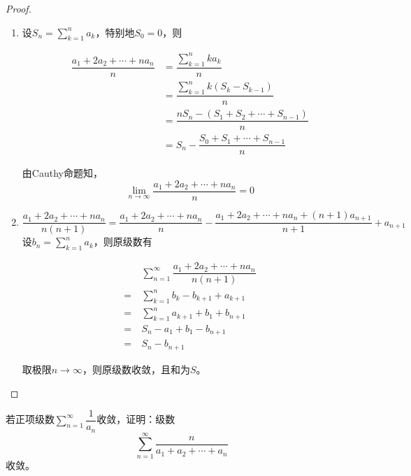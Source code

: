 \begin{proof}
    
    \begin{enumerate}
        
        \item 
            设$S_n = \sum\limits_{k=1}^{n}{a_k}$，特别地$S_0 = 0$，则

            \begin{align*}
                \dfrac{a_1 + 2a_2 + \cdots + na_n}{n} &= \dfrac{\sum\limits_{k=1}^{n}{ka_k}}{n} \\
                & = \dfrac{\sum\limits_{k=1}^{n}{k(S_k - S_{k-1})}}{n} \\
                & = \dfrac{nS_n - (S_1 + S_2 + \cdots + S_{n-1})}{n} \\
                & = S_n - \dfrac{S_0 + S_1 + \cdots + S_{n-1}}{n}
            \end{align*}

            由\textup{Cauthy}命题知，
            $$\lim\limits_{n\to\infty}{\dfrac{a_1 + 2a_2 + \cdots + na_n}{n}} = 0$$

        \item 
            $$\dfrac{a_1 + 2a_2 + \cdots + na_n}{n(n+1)} = \dfrac{a_1 + 2a_2 + \cdots + na_n}{n} - \dfrac{a_1 + 2a_2 + \cdots + na_n + (n+1)a_{n+1}}{n+1} + a_{n+1}$$
            设$b_n = \sum\limits_{k=1}^{n}{a_k}$，则原级数有

            \begin{align*}
                &\sum\limits_{n=1}^{\infty}{\dfrac{a_1 + 2a_2 + \cdots + na_n}{n(n+1)}} \\
                = \  & \sum\limits_{k=1}^{n}{b_k - b_{k+1} + a_{k+1}} \\
                = \  & \sum\limits_{k=1}^{n}{a_{k+1} + b_1 + b_{n+1}} \\
                = \  & S_n - a_1 + b_1 - b_{n+1} \\
                = \  & S_n - b_{n+1} 
            \end{align*}

            取极限$n\to\infty$，则原级数收敛，且和为$S$。

    \end{enumerate}

\end{proof}

\begin{proposition}
    
    若正项级数$\sum\limits_{n=1}^{\infty}{\dfrac{1}{a_n}}$收敛，证明：级数
    $$\sum\limits_{n=1}^{\infty}{\dfrac{n}{a_1 + a_2 + \cdots + a_n}}$$
    收敛。

\end{proposition}

